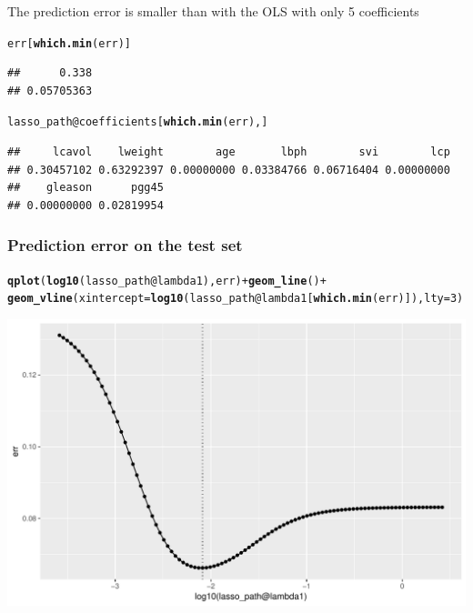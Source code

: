 \documentclass[10pt, c, xcolor=x11names]{beamer}\usepackage[]{graphicx}\usepackage[]{color}
\makeatletter
\newcommand{\hlnum}[1]{\textcolor[rgb]{0.686,0.059,0.569}{#1}}%
\newcommand{\hlopt}[1]{\textcolor[rgb]{0,0,0}{#1}}%
\newcommand{\hlstd}[1]{\textcolor[rgb]{0.345,0.345,0.345}{#1}}%
\newcommand{\hlkwc}[1]{\textcolor[rgb]{0.333,0.667,0.333}{#1}}%
\newcommand{\hlkwd}[1]{\textcolor[rgb]{0.737,0.353,0.396}{\textbf{#1}}}%
\newenvironment{kframe}{%
 \def\at@end@of@kframe{}%
 \ifinner\ifhmode%
  \def\at@end@of@kframe{\end{minipage}}%
  \begin{minipage}{\columnwidth}%
 \fi\fi%
 \def\FrameCommand##1{\hskip\@totalleftmargin \hskip-\fboxsep
 \colorbox{shadecolor}{##1}\hskip-\fboxsep
     \hskip-\linewidth \hskip-\@totalleftmargin \hskip\columnwidth}%
 \MakeFramed {\advance\hsize-\width
   \@totalleftmargin\z@ \linewidth\hsize
   \@setminipage}}%
 {\par\unskip\endMakeFramed%
 \at@end@of@kframe}
\newenvironment{knitrout}{}{} %
\makeatother
\begin{document}
\begin{frame}
The prediction error is smaller than with the OLS with only 5 coefficients
\begin{knitrout}\scriptsize
{}\color{fgcolor}\begin{kframe}
\begin{alltt}
\hlstd{err[}\hlkwd{which.min}\hlstd{(err)]}
\end{alltt}
\begin{verbatim}
##      0.338 
## 0.05705363
\end{verbatim}
\begin{alltt}
\hlstd{lasso_path}\hlopt{@}\hlkwc{coefficients}\hlstd{[}\hlkwd{which.min}\hlstd{(err), ]}
\end{alltt}
\begin{verbatim}
##     lcavol    lweight        age       lbph        svi        lcp 
## 0.30457102 0.63292397 0.00000000 0.03384766 0.06716404 0.00000000 
##    gleason      pgg45 
## 0.00000000 0.02819954
\end{verbatim}
\end{kframe}
\end{knitrout}

\end{frame}

\begin{frame}[containsverbatim]
  \frametitle{Prediction error on the test set}

\begin{knitrout}\scriptsize
{}\color{fgcolor}\begin{kframe}
\begin{alltt}
\hlkwd{qplot}\hlstd{(}\hlkwd{log10}\hlstd{(lasso_path}\hlopt{@}\hlkwc{lambda1}\hlstd{), err)} \hlopt{+} \hlkwd{geom_line}\hlstd{()} \hlopt{+}
\hlkwd{geom_vline}\hlstd{(}\hlkwc{xintercept} \hlstd{=} \hlkwd{log10}\hlstd{(lasso_path}\hlopt{@}\hlkwc{lambda1}\hlstd{[}\hlkwd{which.min}\hlstd{(err)]),} \hlkwc{lty}\hlstd{=}\hlnum{3}\hlstd{)}
\end{alltt}
\end{kframe}
\includegraphics[width=.8\textwidth]{figures/lasso_prostateunnamed-chunk-29-1} 

\end{knitrout}
\end{frame}
\end{document}
